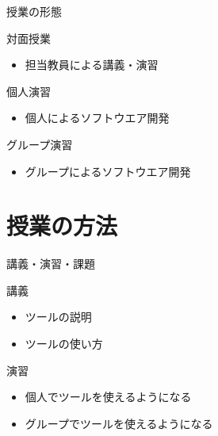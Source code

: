 \documentclass[t, aspectratio=169]{beamer}
\begin{document}
\begin{frame}[label=sec-1-2-3]{授業の形態}
\begin{block}{対面授業}
\begin{itemize}
\item 担当教員による講義・演習
\end{itemize}
\end{block}

\begin{block}{個人演習}
\begin{itemize}
\item 個人によるソフトウエア開発
\end{itemize}
\end{block}

\begin{block}{グループ演習}
\begin{itemize}
\item グループによるソフトウエア開発
\end{itemize}
\end{block}
\end{frame}

\section{授業の方法}
\label{sec-1-3}
\begin{frame}[label=sec-1-3-1]{講義・演習・課題}
\begin{block}{講義}
\begin{itemize}
\item ツールの説明
\item ツールの使い方
\end{itemize}
\end{block}

\begin{block}{演習}
\begin{itemize}
\item 個人でツールを使えるようになる
\item グループでツールを使えるようになる
\end{itemize}
\end{block}
\end{frame}
\end{document}
